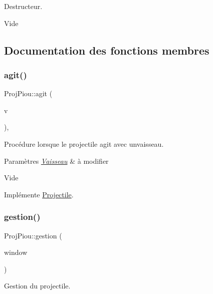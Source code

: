 Destructeur. 

Vide 

\subsection{Documentation des fonctions membres}
\mbox{\label{class_proj_piou_a1594d1ba2fd53ff82af597d2505a7db2}} 
\subsubsection{\texorpdfstring{agit()}{agit()}}
{\footnotesize\ttfamily Proj\+Piou\+::agit (\begin{DoxyParamCaption}\item[{\hyperlink{class_vaisseau}{Vaisseau} \&}]{v }\end{DoxyParamCaption})\hspace{0.3cm}{\ttfamily [inline]}, {\ttfamily [virtual]}}



Procédure lorsque le projectile agit avec unvaisseau. 


\begin{DoxyParams}{Paramètres}
{\em \hyperlink{class_vaisseau}{Vaisseau}} & à modifier\\
\hline
\end{DoxyParams}
Vide 

Implémente \hyperlink{class_projectile_a8550c8b1b012c5c290fb6da5b06f57ef}{Projectile}.

\mbox{\label{class_proj_piou_a01b45e4045391883472e283e027cf7de}} 
\subsubsection{\texorpdfstring{gestion()}{gestion()}}
{\footnotesize\ttfamily Proj\+Piou\+::gestion (\begin{DoxyParamCaption}\item[{sf\+::\+Render\+Window \&}]{window }\end{DoxyParamCaption})\hspace{0.3cm}{\ttfamily [virtual]}}



Gestion du projectile. 


